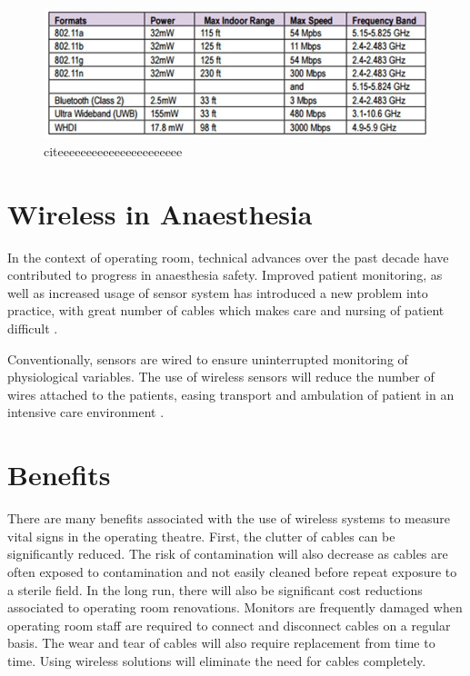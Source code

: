 \begin{figure}[H]
	\centering
	\includegraphics[width=\linewidth]{lit1.jpg}
	\caption{citeeeeeeeeeeeeeeeeeeeeee\cite{hall2015guyton}}
	\label{literaturereview1}
\end{figure}

\section{Wireless in Anaesthesia}

In the context of operating room, technical advances over the past decade have contributed to progress in anaesthesia safety. Improved patient monitoring, as well as increased usage of sensor system has introduced a new problem into practice, with great number of cables which makes care and nursing of patient difficult \cite{lit3}. 

Conventionally, sensors are wired to ensure uninterrupted monitoring of physiological variables. The use of wireless sensors will reduce the number of wires attached to the patients, easing transport and ambulation of patient in an intensive care environment \cite{lit2}. 

\section{Benefits}

There are many benefits associated with the use of wireless systems to measure vital signs in the operating theatre. First, the clutter of cables can be significantly reduced. The risk of contamination will also decrease as cables are often exposed to contamination and not easily cleaned before repeat exposure to a sterile field. In the long run, there will also be significant cost reductions associated to operating room renovations. Monitors are frequently damaged when operating room staff are required to connect and disconnect cables on a regular basis. The wear and tear of cables will also require replacement from time to time. Using wireless solutions will eliminate the need for cables completely. 

